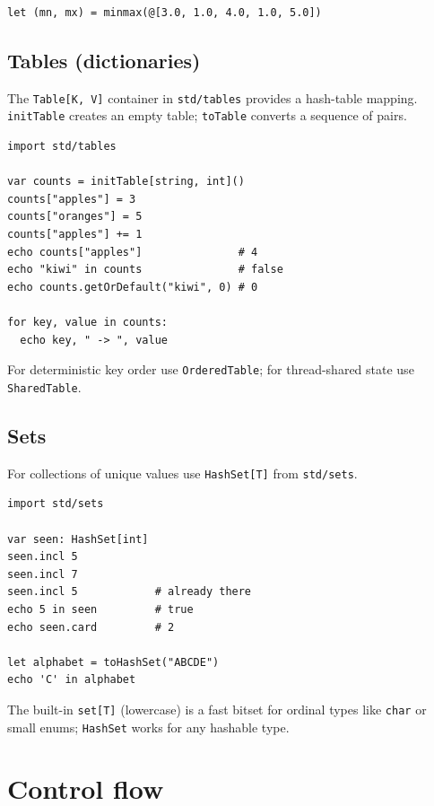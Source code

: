 \documentclass[justified, sixbynine]{tufte-book}
\def\ft{\small\tt}
\theoremstyle{plain}%
\newtheorem * {corollary}{Corollary}
\theoremstyle{definition}
\theoremstyle{remark}
\newtheorem * {remark}{Remark}
\newtheorem * {note}{Note}
\begin{document}
\begin{fullwidth}
\begin{lstlisting}
let (mn, mx) = minmax(@[3.0, 1.0, 4.0, 1.0, 5.0])
\end{lstlisting}

\goodbreak\subsection{Tables (dictionaries)}


The {\ft Table[K, V]} container in {\ft std/tables} provides a hash-table mapping. {\ft initTable} creates an empty table; {\ft toTable} converts a sequence of pairs.

\begin{lstlisting}
import std/tables

var counts = initTable[string, int]()
counts["apples"] = 3
counts["oranges"] = 5
counts["apples"] += 1
echo counts["apples"]               # 4
echo "kiwi" in counts               # false
echo counts.getOrDefault("kiwi", 0) # 0

for key, value in counts:
  echo key, " -> ", value
\end{lstlisting}

For deterministic key order use {\ft OrderedTable}; for thread-shared state use {\ft SharedTable}.

\goodbreak\subsection{Sets}


For collections of unique values use {\ft HashSet[T]} from {\ft std/sets}.

\begin{lstlisting}
import std/sets

var seen: HashSet[int]
seen.incl 5
seen.incl 7
seen.incl 5            # already there
echo 5 in seen         # true
echo seen.card         # 2

let alphabet = toHashSet("ABCDE")
echo 'C' in alphabet
\end{lstlisting}

The built-in {\ft set[T]} (lowercase) is a fast bitset for ordinal types like {\ft char} or small enums; {\ft HashSet} works for any hashable type.

\goodbreak\section{Control flow}


\end{fullwidth}
\end{document}
